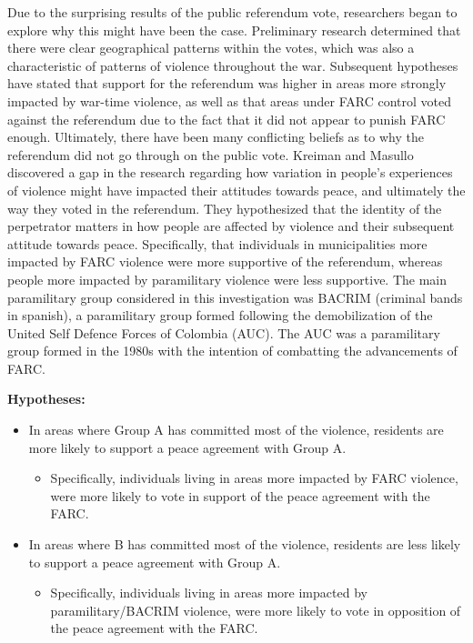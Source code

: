 \documentclass[12pt,letterpaper]{article}
\begin{document}
	Due to the surprising results of the public referendum vote, researchers began to explore why this might have been the case. Preliminary research determined that there were clear geographical patterns within the votes, which was also a characteristic of patterns of violence throughout the war. Subsequent hypotheses have stated that support for the referendum was higher in areas more strongly impacted by war-time violence, as well as that areas under FARC control voted against the referendum due to the fact that it did not appear to punish FARC enough. Ultimately, there have been many conflicting beliefs as to why the referendum did not go through on the public vote. Kreiman and Masullo discovered a gap in the research regarding how variation in people's experiences of violence might have impacted their attitudes towards peace, and ultimately the way they voted in the referendum. They hypothesized that the identity of the perpetrator matters in how people are affected by violence and their subsequent attitude towards peace. Specifically, that individuals in municipalities more impacted by FARC violence were more supportive of the referendum, whereas people more impacted by paramilitary violence were less supportive. The main paramilitary group considered in this investigation was BACRIM (criminal bands in spanish), a paramilitary group formed following the demobilization of the United Self Defence Forces of Colombia (AUC). The AUC was a paramilitary group formed in the 1980s with the intention of combatting the advancements of FARC.
	
	\vspace{.5cm}
	
	\textbf{Hypotheses:}
		\begin{itemize}
			\item In areas where Group A has committed most of the violence, residents are more likely to support a peace agreement with Group A.
				\begin{itemize}
					\item Specifically, individuals living in areas more impacted by FARC violence, were more likely to vote in support of the peace agreement with the FARC.
				\end{itemize}
			\item In areas where B has committed most of the violence, residents are less likely to support a peace agreement with Group A.
				\begin{itemize}
					\item Specifically, individuals living in areas more impacted by paramilitary/BACRIM violence, were more likely to vote in opposition of the peace agreement with the FARC.
				\end{itemize}
		\end{itemize}
	
\end{document}
